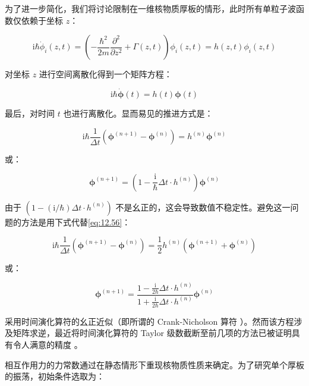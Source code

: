 为了进一步简化，我们将讨论限制在一维核物质厚板的情形，此时所有单粒子波函数仅依赖于坐标 $z$：

\begin{equation}
\mathrm{i}\hbar\dot{\phi}_{i}(z,t)=\left(-\frac{\hbar^{2}}{2m}\frac{\partial^{2}}{\partial z^{2}}+\Gamma(z,t)\right)\phi_{i}(z,t)=h(z,t)\phi_{i}(z,t)\label{eq:12.54}
\end{equation}

对坐标 $z$ 进行空间离散化得到一个矩阵方程：

\begin{equation}
\mathrm{i}\hbar\dot{\boldsymbol{\phi}}(t)=h(t)\boldsymbol{\phi}(t)\label{eq:12.55}
\end{equation}

最后，对时间 $t$ 也进行离散化。显而易见的推进方式是：

\begin{equation}
\mathrm{i}\hbar\frac{1}{\Delta t}(\boldsymbol{\phi}^{(n+1)}-\boldsymbol{\phi}^{(n)})=h^{(n)}\boldsymbol{\phi}^{(n)}\label{eq:12.56}
\end{equation}

或：

\begin{equation}
\boldsymbol{\phi}^{(n+1)}=\left(1-\frac{\mathrm{i}}{\hbar}\Delta t\cdot h^{(n)}\right)\boldsymbol{\phi}^{(n)}\label{eq:12.57}
\end{equation}

由于 $(1-(\mathrm{i}/\hbar)\Delta t\cdot h^{(n)})$ 不是幺正的，这会导致数值不稳定性。避免这一问题的方法是用下式代替\ref{eq:12.56}：

\begin{equation}
\mathrm{i}\hbar\frac{1}{\Delta t}(\boldsymbol{\phi}^{(n+1)}-\boldsymbol{\phi}^{(n)})=\frac{1}{2}h^{(n)}(\boldsymbol{\phi}^{(n+1)}+\boldsymbol{\phi}^{(n)})\label{eq:12.58}
\end{equation}

或：

\begin{equation}
\boldsymbol{\phi}^{(n+1)}=\frac{1-\frac{\mathrm{i}}{2\hbar}\Delta t\cdot h^{(n)}}{1+\frac{\mathrm{i}}{2\hbar}\Delta t\cdot h^{(n)}}\boldsymbol{\phi}^{(n)}\label{eq:12.59}
\end{equation}

采用时间演化算符的幺正近似（即所谓的 Crank-Nicholson 算符 \cite{CN47}）。然而该方程涉及矩阵求逆，最近将时间演化算符的
Taylor 级数截断至前几项的方法已被证明具有令人满意的精度 \cite{FKW78}。

相互作用力的力常数通过在静态情形下重现核物质性质来确定。为了研究单个厚板的振荡，初始条件选取为：

